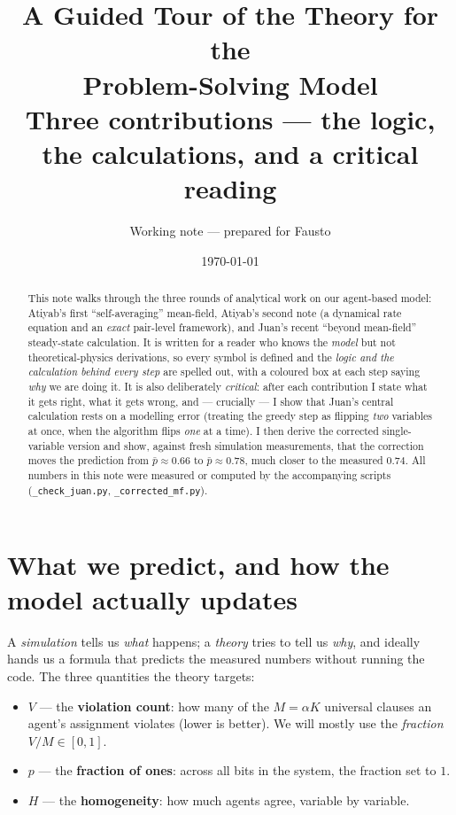 \documentclass[11pt]{article}
\title{\textbf{A Guided Tour of the Theory for the\\ Problem-Solving Model}\\[4pt]
\large Three contributions --- the logic, the calculations, and a critical reading}
\author{Working note --- prepared for Fausto}
\date{\today}
\begin{document}
\maketitle

\begin{abstract}
\noindent This note walks through the three rounds of analytical work on our agent-based model:
Atiyab's first ``self-averaging'' mean-field, Atiyab's second note (a dynamical rate equation and
an \emph{exact} pair-level framework), and Juan's recent ``beyond mean-field'' steady-state
calculation. It is written for a reader who knows the \emph{model} but not theoretical-physics
derivations, so every symbol is defined and the \emph{logic and the calculation behind every step}
are spelled out, with a coloured box at each step saying \emph{why} we are doing it. It is also
deliberately \emph{critical}: after each contribution I state what it gets right, what it gets
wrong, and --- crucially --- I show that Juan's central calculation rests on a modelling error
(treating the greedy step as flipping \emph{two} variables at once, when the algorithm flips
\emph{one} at a time). I then derive the corrected single-variable version and show, against fresh
simulation measurements, that the correction moves the prediction from $\bar p\approx0.66$ to
$\bar p\approx0.78$, much closer to the measured $0.74$. All numbers in this note were measured or
computed by the accompanying scripts (\texttt{\_check\_juan.py}, \texttt{\_corrected\_mf.py}).
\end{abstract}

\tableofcontents

\section{What we predict, and how the model actually updates}

A \emph{simulation} tells us \emph{what} happens; a \emph{theory} tries to tell us \emph{why}, and
ideally hands us a formula that predicts the measured numbers without running the code. The three
quantities the theory targets:
\begin{itemize}[nosep]
  \item $V$ --- the \textbf{violation count}: how many of the $M=\alpha K$ universal clauses an
        agent's assignment violates (lower is better). We will mostly use the \emph{fraction}
        $V/M\in[0,1]$.
  \item $p$ --- the \textbf{fraction of ones}: across all bits in the system, the fraction set to $1$.
  \item $H$ --- the \textbf{homogeneity}: how much agents agree, variable by variable.
\end{itemize}
\end{document}
